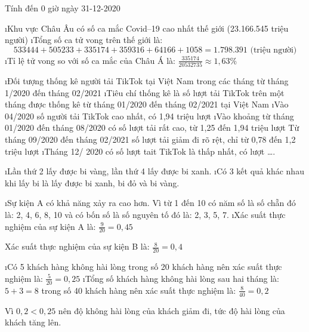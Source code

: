 \begin{Answer}{3}
		Tính đến 0 giờ ngày 31-12-2020
		\begin{enumerate}[a),leftmargin=*]
			\i Khu vực Châu Âu có số ca mắc Covid--19 cao nhất thế giới (23.166.545 triệu người)
			\i Tổng số ca tử vong trên thế giới là:
			\[533444 + 505233 + 335174 + 359316 + 64166 + 1058 = 1.798.391 \text{ (triệu người)}\]
			\i Tỉ lệ tử vong so với số ca mắc của Châu Á là:  $\frac{{335174}}{{20532735}} \approx 1,63\%$
		\end{enumerate}
	
\end{Answer}
\begin{Answer}{4}
		\begin{enumerate}[--,leftmargin=*]
			\i Đối tượng thống kê người tải TikTok tại Việt Nam trong các tháng từ tháng 1/2020 đến tháng 02/2021
			\i Tiêu chí thống kê là số lượt tải TikTok trên một tháng được thống kê từ tháng 01/2020 đến tháng 02/2021 tại Việt Nam
			\i Vào 04/2020 số người tải TikTok cao nhất, có 1,94 triệu lượt
			\i Vào khoảng từ tháng 01/2020 đến tháng 08/2020 có số lượt tải rất cao, từ 1,25  đến 1,94 triệu lượt
			Từ tháng 09/2020 đến tháng 02/2021 số lượt tải giảm đi rõ rệt, chỉ từ 0,78 đến 1,2 triệu lượt
			\i Tháng 12/ 2020 có số lượt tait TikTok là thấp nhất, có  lượt \ldots.
		\end{enumerate}
	
\end{Answer}
\begin{Answer}{5}
		\begin{enumerate}[a),leftmargin=*]
			\i Lần thứ 2 lấy được bi vàng, lần thứ 4 lấy được bi xanh.
			\i Có 3 kết quả khác nhau khi lấy bi là lấy được bi xanh, bi đỏ và bi vàng.
		\end{enumerate}
	
\end{Answer}
\begin{Answer}{6}
		\begin{enumerate}[a),leftmargin=*]
			\i Sự kiện A có khả năng xảy ra cao hơn. Vì từ 1 đến 10 có năm số là số chẵn đó là: 2, 4, 6, 8, 10 và có bốn số là số nguyên tố đó là: 2, 3, 5, 7.
			\i Xác suất thực nghiệm của sự kiện A là: $\frac{9}{{20}} = 0,45$
			
			Xác suất thực nghiệm của sự kiện B là:  $\frac{8}{{20}} = 0,4$
		\end{enumerate}
	
\end{Answer}
\begin{Answer}{7}
		\begin{enumerate}[a),leftmargin=*]
			\i Có 5 khách hàng không hài lòng trong số 20 khách hàng nên xác suất thực nghiệm là: $\frac{5}{{20}} = 0,25$
			\i Tổng số khách hàng không hài lòng sau hai tháng là: $5 + 3 = 8$ trong số 40 khách hàng nên xác suất thực nghiệm là:   $\frac{8}{{40}} = 0,2$
			
			Vì $0,2 < 0,25$ nên độ không hài lòng của khách giảm đi, tức độ hài lòng của khách tăng lên.
		\end{enumerate}
	
\end{Answer}
